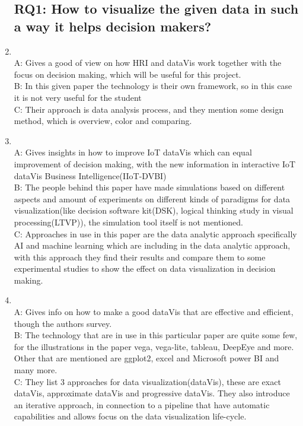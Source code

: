 \documentclass{article}
\begin{document}
\begin{enumerate}

\subsection{RQ1: How to visualize the given data in such a way it helps decision makers?}
	\item  \cite{szafir2021connecting}
        \\A: Gives a good of view on how HRI and dataVis work together with the focus on decision making, which will be useful for this project.
    	\\B: In this given paper the technology is their own framework, so in this case it is not very useful for the student
    	\\C: Their approach is data analysis process, and they mention some design method, which is overview, color and comparing.
	\item \cite{zhang2021interactive}
		\\A: Gives insights in how to improve IoT dataVis which can equal improvement of decision making, with the new information in interactive IoT dataVis Business Intelligence(IIoT-DVBI)
		\\B: The people behind this paper have made simulations based on different aspects and amount of experiments on different kinds of paradigms for data visualization(like decision software kit(DSK), logical thinking study in visual processing(LTVP)), the simulation tool itself is not mentioned.
		\\C: Approaches in use in this paper are the data analytic approach specifically AI and machine learning which are including in the data analytic approach, with this approach they find their results and compare them to some experimental studies to show the effect on data visualization in decision making.
	\item  \cite{qin2020making}
		\\A: Gives info on how to make a good dataVis that are effective and efficient, though the authors survey.
		\\B: The technology that are in use in this particular paper are quite some few, for the illustrations in the paper vega, vega-lite, tableau, DeepEye and more. Other that are mentioned are ggplot2, excel and Microsoft power BI and many more.
		\\C: They list 3 approaches for data visualization(dataVis), these are exact dataVis, approximate dataVis and progressive dataVis. They also introduce an iterative approach, in connection to a pipeline that have automatic capabilities and allows focus on the data visualization life-cycle. 

\end{enumerate}
\end{document}
